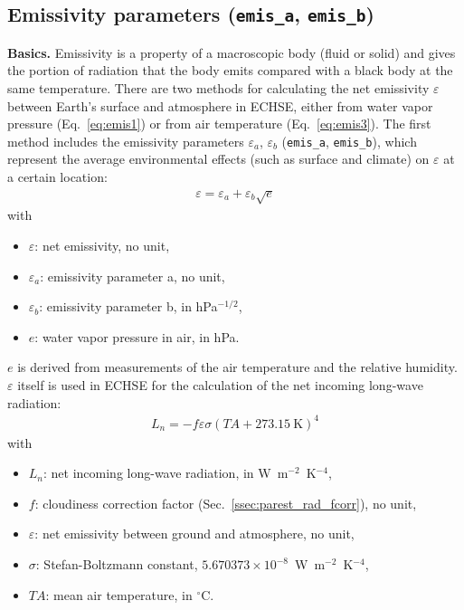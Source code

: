 \documentclass{scrreprt}
\newenvironment{denseitem}{
  \begin{itemize}
    \setlength{\itemsep}{0pt}
    \setlength{\parskip}{0pt}
    \setlength{\parsep}{0pt}
}{
  \end{itemize}
}
\begin{document}
\subsection{Emissivity parameters (\texttt{emis\_a}, \texttt{emis\_b})} \label{ssec:parest_rad_emis}

\textbf{Basics.}
Emissivity is a property of a macroscopic body (fluid or solid) and gives the portion of radiation that the body emits compared with a black body at the same temperature.
There are two methods for calculating the net emissivity $\varepsilon$ between Earth's surface and atmosphere in ECHSE, either from water vapor pressure (Eq.~\ref{eq:emis1}) or from air temperature (Eq.~\ref{eq:emis3}).
The first method includes the emissivity parameters $\varepsilon_a$, $\varepsilon_b$ (\verb!emis_a!, \verb!emis_b!), which represent the average environmental effects (such as surface and climate) on $\varepsilon$ at a certain location:
\begin{align} \label{eq:emis1}
  \varepsilon = \varepsilon_a + \varepsilon_b \sqrt{e}
\end{align}
%
with
\begin{denseitem}
  \item[] $\varepsilon$: net emissivity, no unit,
  \item[] $\varepsilon_a$: emissivity parameter a, no unit,
  \item[] $\varepsilon_b$: emissivity parameter b, in hPa$^{-1/2}$,
  \item[] $e$: water vapor pressure in air, in hPa.
\end{denseitem}
%
$e$ is derived from measurements of the air temperature and the relative humidity.
$\varepsilon$ itself is used in ECHSE for the calculation of the net incoming long-wave radiation:
\begin{align} \label{eq:emis2}
  L_n = -f \varepsilon \sigma (TA + 273.15~\text{K})^4
\end{align}
%
with
\begin{denseitem}
  \item[] $L_n$: net incoming long-wave radiation, in W~m$^{-2}$~K$^{-4}$,
  \item[] $f$: cloudiness correction factor (Sec.~\ref{ssec:parest_rad_fcorr}), no unit,
  \item[] $\varepsilon$: net emissivity between ground and atmosphere, no unit,
  \item[] $\sigma$: Stefan-Boltzmann constant, $5.670373 \times 10^{-8}$~W~m$^{-2}$~K$^{-4}$,
  \item[] ${TA}$: mean air temperature, in $^\circ$C.
\end{denseitem}
\end{document}
